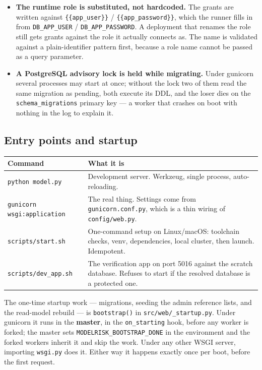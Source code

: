 \documentclass[11pt]{article}
\newcommand{\cfg}[1]{\texttt{#1}}
\begin{document}
\begin{itemize}
  \item \textbf{The runtime role is substituted, not hardcoded.} The grants are written
        against \texttt{\{\{app\_user\}\}} / \texttt{\{\{app\_password\}\}}, which the
        runner fills in from \cfg{DB\_APP\_USER} / \cfg{DB\_APP\_PASSWORD}. A deployment
        that renames the role still gets grants against the role it actually connects as.
        The name is validated against a plain-identifier pattern first, because a role name
        cannot be passed as a query parameter.
  \item \textbf{A PostgreSQL advisory lock is held while migrating.} Under gunicorn several
        processes may start at once; without the lock two of them read the same migration
        as pending, both execute its DDL, and the loser dies on the
        \texttt{schema\_migrations} primary key --- a worker that crashes on boot with
        nothing in the log to explain it.
\end{itemize}

\subsection{Entry points and startup}

\begin{longtable}{@{}p{}p{}@{}}
\toprule
\textbf{Command} & \textbf{What it is} \\
\midrule
\endhead
\texttt{python model.py} & Development server. Werkzeug, single process, auto-reloading.\\
\texttt{gunicorn wsgi:application} & The real thing. Settings come from
  \texttt{gunicorn.conf.py}, which is a thin wiring of \texttt{config/web.py}. \\
\texttt{scripts/start.sh} & One-command setup on Linux/macOS: toolchain checks, venv,
  dependencies, local cluster, then launch. Idempotent. \\
\texttt{scripts/dev\_app.sh} & The verification app on port 5016 against the scratch
  database. Refuses to start if the resolved database is a protected one. \\
\bottomrule
\end{longtable}

The one-time startup work --- migrations, seeding the admin reference lists, and the
read-model rebuild --- is \texttt{bootstrap()} in \texttt{src/web/\_startup.py}. Under
gunicorn it runs in the \textbf{master}, in the \texttt{on\_starting} hook, before any
worker is forked; the master sets \cfg{MODELRISK\_BOOTSTRAP\_DONE} in the environment and
the forked workers inherit it and skip the work. Under any other WSGI server, importing
\texttt{wsgi.py} does it. Either way it happens exactly once per boot, before the first
request.
\end{document}
